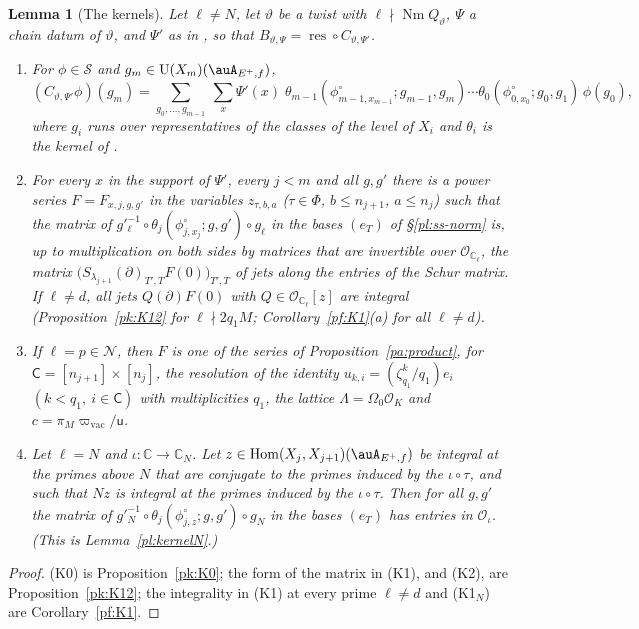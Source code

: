 \documentclass[10pt]{amsart}
\newtheorem{lemma}[theorem]{Lemma}
\theoremstyle{definition}
\theoremstyle{remark}
\newcommand{\C}{\mathbb C}
\providecommand{\auNm}{\operatorname{Nm}}
\providecommand{\auO}{\mathcal O}
\providecommand{\auPl}{\Phi}
\providecommand{\auS}{\mathcal S}
\providecommand{\auU}{\mathrm U}
\begin{document}
\begin{lemma}[The kernels]\label{pa:kernel}
Let $\ell\ne N$, let $\vartheta$ be a twist with $\ell\nmid\auNm Q_\vartheta$, $\Psi$ a chain datum
of $\vartheta$, and $\Psi'$ as in {\cite[Proposition~14.25]{P46}}, so that
$B_{\vartheta,\Psi}=\operatorname{res}\circ C_{\vartheta,\Psi'}$.
\begin{enumerate}
\item[(K0)] For $\phi\in\auS$ and $g_m\in\auU(X_m)(\auA_{E^+,f})$,
\[
(C_{\vartheta,\Psi'}\phi)(g_m)=\sum_{g_0,\dots,g_{m-1}}\ \sum_x\Psi'(x)\;\theta_{m-1}
(\phi^\circ_{m-1,x_{m-1}};g_{m-1},g_m)\cdots\theta_0(\phi^\circ_{0,x_0};g_0,g_1)\,\phi(g_0),
\]
where $g_i$ runs over representatives of the classes of the level of $X_i$ and $\theta_i$ is the
kernel of {\cite[\S14.8]{P46}}.
\item[(K1)] For every $x$ in the support of $\Psi'$, every $j<m$ and all $g,g'$ there is a power
series $F=F_{x,j,g,g'}$ in the variables $z_{\tau,b,a}$ ($\tau\in\auPl$, $b\le n_{j+1}$, $a\le n_j$)
such that the matrix of $g'^{-1}_\ell\circ\theta_j(\phi^\circ_{j,x_j};g,g')\circ g_\ell$ in the
bases $(e_T)$ of \S\ref{pl:ss-norm} is, up to multiplication on both sides by matrices that are
invertible over $\auO_{\C_\ell}$, the matrix
$\bigl(S_{\lambda_{j+1}}(\partial)_{T',T}F(0)\bigr)_{T',T}$ of jets along the entries of the Schur
matrix. If $\ell\ne d$, all jets $Q(\partial)F(0)$ with $Q\in\auO_{\C_\ell}[z]$ are integral
(Proposition~\ref{pk:K12} for $\ell\nmid2q_1M$; Corollary~\ref{pf:K1}(a) for all $\ell\ne d$).
\item[(K2)] If $\ell=p\in\mathcal N$, then $F$ is one of the series of
Proposition~\ref{pa:product}, for $\mathsf C=[n_{j+1}]\times[n_j]$, the resolution of the identity
$u_{k,i}=(\zeta_{q_1}^k/q_1)e_i$ $(k<q_1,\ i\in\mathsf C)$ with multiplicities $q_1$, the lattice
$\Lambda=\Omega_0\auO_K$ and $c=\pi_M\varpi_{\mathrm{vac}}/\mathsf u$.
\item[(K1$_N$)] Let $\ell=N$ and $\iota\colon\C\to\C_N$. Let $z\in\operatorname{Hom}(X_j,X_{j+1})(\auA_{E^+,f})$
be integral at the primes above $N$ that are conjugate to the primes induced by the $\iota\circ\tau$,
and such that $Nz$ is integral at the primes induced by the $\iota\circ\tau$. Then for all $g,g'$ the
matrix of $g'^{-1}_N\circ\theta_j(\phi^\circ_{j,z};g,g')\circ g_N$ in the bases $(e_T)$ has entries in
$\auO_\iota$. (This is Lemma~\ref{pl:kernelN}.)
\end{enumerate}
\end{lemma}
\begin{proof} (K0) is Proposition~\ref{pk:K0}; the form of the matrix in (K1), and (K2), are
Proposition~\ref{pk:K12}; the integrality in (K1) at every prime $\ell\ne d$ and (K1$_N$) are
Corollary~\ref{pf:K1}.\end{proof}
\end{document}
